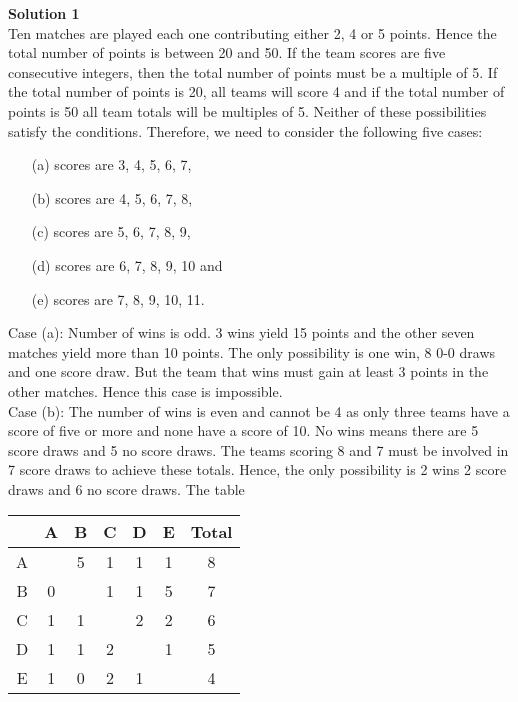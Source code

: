 \documentclass{article}
\begin{document}
\begin{enumerate}[1.]
\textbf{Solution 1}\\
Ten matches are played each one contributing either 2, 4 or 5 points. Hence the total number of points is between 20 and 50. If the team scores are five consecutive integers, then the total number of points must be a multiple of 5. If the total number of points is 20, all teams will score 4 and if the total number of points is 50 all team totals will be multiples of 5. Neither of these possibilities satisfy the conditions. Therefore, we need to consider the following five cases:
\begin{itemize}
	\item [(a)] scores are 3, 4, 5, 6, 7,
	\item [(b)] scores are 4, 5, 6, 7, 8,
	\item [(c)] scores are 5, 6, 7, 8, 9,
	\item [(d)] scores are 6, 7, 8, 9, 10 and
	\item [(e)] scores are 7, 8, 9, 10, 11.
\end{itemize}
Case (a): Number of wins is odd. 3 wins yield 15 points and the other seven matches yield more than 10 points. The only possibility is one win, 8 0-0 draws and one score draw. But the team that wins must gain at least 3 points in the other matches. Hence this case is impossible.\\
Case (b): The number of wins is even and cannot be 4 as only three teams have a score of five or more and none have a score of 10. No wins means there are 5 score draws and 5 no score draws. The teams scoring 8 and 7 must be involved in 7 score draws to achieve these totals. Hence, the only possibility is 2 wins 2 score draws and 6 no score draws. The table

\begin{table}[ht!]
	\begin{center}
	  \begin{tabular}{ | c | c | c | c | c | c | c |}
		  \hline
		    & A & B & C & D & E & Total\\
		  \hline  
		  A &   & 5 & 1 & 1 & 1 & 8\\
		  \hline  
		  B & 0 &   & 1 & 1 & 5 & 7\\
		  \hline  
		  C & 1 & 1 &   & 2 & 2 & 6\\
		  \hline  
		  D & 1 & 1 & 2 &   & 1 & 5\\
		  \hline  
		  E & 1 & 0 & 2 & 1 &   & 4\\
		  \hline  
	  \end{tabular}
	\end{center}
\end{table}


\end{enumerate}
\end{document}
